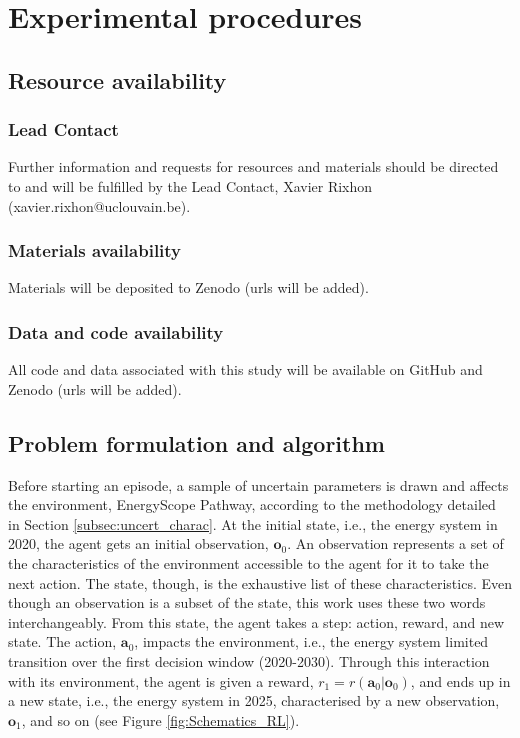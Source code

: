 \documentclass[11pt,twoside,a4paper,english]{article}
\def\ie{i.e., }
\begin{document}
\section{Experimental procedures}

\subsection{Resource availability}

\subsubsection{Lead Contact}
Further information and requests for resources and materials should be directed to and will be fulfilled by the Lead Contact, Xavier Rixhon (xavier.rixhon@uclouvain.be). 

\subsubsection{Materials availability}
Materials will be deposited to Zenodo {\color{red}(urls will be added)}.

\subsubsection{Data and code availability}
All code and data associated with this study will be available on GitHub and Zenodo {\color{red}(urls will be added)}.

\subsection{Problem formulation and algorithm}
\label{exp_proc:prob_algo}
Before starting an episode, a sample of uncertain parameters is drawn and affects the environment, EnergyScope Pathway, according to the methodology detailed in Section \ref{subsec:uncert_charac}. At the initial state, \ie the energy system in 2020, the agent gets an initial observation, $\bm{o}_0$. An observation represents a set of the characteristics of the environment accessible to the agent for it to take the next action. The state, though, is the exhaustive list of these characteristics. Even though an observation is a subset of the state, this work uses these two words interchangeably. From this state, the agent takes a step: action, reward,  and new state. The action, $\bm{a}_0$, impacts the environment, \ie the energy system limited transition over the first decision window (2020-2030). Through this interaction with its environment, the agent is given a reward, $r_1=r\left(\bm{a}_0 | \bm{o}_0 \right)$, and ends up in a new state, \ie the energy system in 2025, characterised by a new observation, $\bm{o}_1$, and so on (see Figure \ref{fig:Schematics_RL}).
\end{document}
